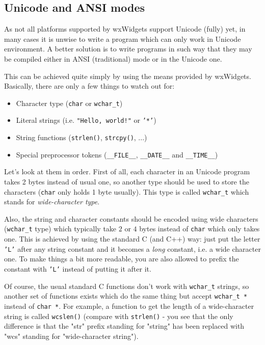 \subsection{Unicode and ANSI modes}\label{unicodeandansi}

As not all platforms supported by wxWidgets support Unicode (fully) yet, in
many cases it is unwise to write a program which can only work in Unicode
environment. A better solution is to write programs in such way that they may
be compiled either in ANSI (traditional) mode or in the Unicode one.

This can be achieved quite simply by using the means provided by wxWidgets.
Basically, there are only a few things to watch out for:

\begin{itemize}
\item Character type ({\tt char} or {\tt wchar\_t})
\item Literal strings (i.e. {\tt "Hello, world!"} or {\tt '*'})
\item String functions ({\tt strlen()}, {\tt strcpy()}, ...)
\item Special preprocessor tokens ({\tt \_\_FILE\_\_}, {\tt \_\_DATE\_\_} 
and {\tt \_\_TIME\_\_})
\end{itemize}

Let's look at them in order. First of all, each character in an Unicode
program takes 2 bytes instead of usual one, so another type should be used to
store the characters ({\tt char} only holds 1 byte usually). This type is
called {\tt wchar\_t} which stands for {\it wide-character type}.

Also, the string and character constants should be encoded using wide
characters ({\tt wchar\_t} type) which typically take $2$ or $4$ bytes instead
of {\tt char} which only takes one. This is achieved by using the standard C
(and C++) way: just put the letter {\tt 'L'} after any string constant and it
becomes a {\it long} constant, i.e. a wide character one. To make things a bit
more readable, you are also allowed to prefix the constant with {\tt 'L'}
instead of putting it after it.

Of course, the usual standard C functions don't work with {\tt wchar\_t}
strings, so another set of functions exists which do the same thing but accept
{\tt wchar\_t *} instead of {\tt char *}. For example, a function to get the
length of a wide-character string is called {\tt wcslen()} (compare with 
{\tt strlen()} - you see that the only difference is that the "str" prefix
standing for "string" has been replaced with "wcs" standing for "wide-character
string").

